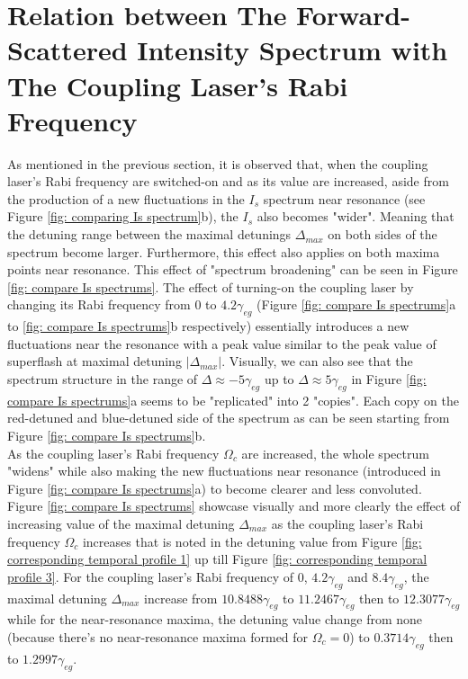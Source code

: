 \section{Relation between The Forward-Scattered Intensity Spectrum with The Coupling Laser's Rabi Frequency}
As mentioned in the previous section, it is observed that, when the coupling laser's Rabi frequency are switched-on and as its value are increased, aside from the production of a new fluctuations in the $I_{s}$ spectrum near resonance (see Figure \ref{fig: comparing Is spectrum}b), the $I_{s}$ also becomes "wider". Meaning  that the detuning range between the maximal detunings $\Delta_{max}$ on both sides of the spectrum become larger. Furthermore, this effect also applies on both maxima points near resonance. This effect of "spectrum broadening" can be seen in Figure \ref{fig: compare Is spectrums}. The effect of turning-on the coupling laser by changing its Rabi frequency from $0$ to $4.2\gamma_{eg}$ (Figure \ref{fig: compare Is spectrums}a to \ref{fig: compare Is spectrums}b respectively) essentially introduces a new fluctuations near the resonance with a peak value similar to the peak value of superflash at maximal detuning $|\Delta_{max}|$. Visually, we can also see that the spectrum structure in the range of  $\Delta \approx -5\gamma_{eg}$ up to $\Delta \approx 5\gamma_{eg}$ in Figure \ref{fig: compare Is spectrums}a seems to be "replicated" into 2 "copies". Each copy on the red-detuned and blue-detuned side of the spectrum as can be seen starting from Figure \ref{fig: compare Is spectrums}b.\\

As the coupling laser's Rabi frequency $\Omega_{c}$ are increased, the whole spectrum "widens" while also making the new fluctuations near resonance (introduced in Figure \ref{fig: compare Is spectrums}a) to become clearer and less convoluted. Figure \ref{fig: compare Is spectrums} showcase visually and more clearly the effect of increasing value of the maximal detuning $\Delta_{max}$ as the coupling laser's Rabi frequency $\Omega_{c}$ increases that is noted in the detuning value from Figure \ref{fig: corresponding temporal profile 1} up till Figure \ref{fig: corresponding temporal profile 3}. For the coupling laser's Rabi frequency of $0$, $4.2\gamma_{eg}$ and $8.4\gamma_{eg}$, the maximal detuning $\Delta_{max}$ increase from $10.8488\gamma_{eg}$ to $11.2467\gamma_{eg}$ then to $12.3077\gamma_{eg}$ while for the near-resonance maxima, the detuning value change from none (because there's no near-resonance maxima formed for $\Omega_{c} = 0$) to $0.3714\gamma_{eg}$ then to $1.2997\gamma_{eg}$.

